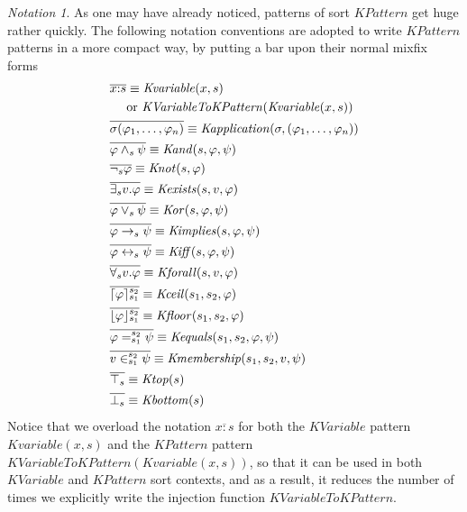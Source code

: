 \documentclass[UTF8,11pt]{article}
\newcounter{thmcounter}
\theoremstyle{plain}
\theoremstyle{definition}
\theoremstyle{remark}
\newtheorem{notation}   [thmcounter]{Notation}
\DeclarePairedDelimiter{\ceil}{\lceil}{\rceil}
\DeclarePairedDelimiter{\floor}{\lfloor}{\rfloor}
\newcommand{\cln}{{:}}
\newcommand{\KVariable}{\mathit{KVariable}}
\newcommand{\KVariableToKPattern}{\mathit{KVariableToKPattern}}
\newcommand{\KPattern}{\mathit{KPattern}}
\newcommand{\Kvariable}{\mathit{Kvariable}}
\newcommand{\Kand}{\mathit{Kand}}
\newcommand{\Kor}{\mathit{Kor}}
\newcommand{\Kimplies}{\mathit{Kimplies}}
\newcommand{\Kiff}{\mathit{Kiff}}
\newcommand{\Knot}{\mathit{Knot}}
\newcommand{\Kapplication}{\mathit{Kapplication}}
\newcommand{\Kexists}{\mathit{Kexists}}
\newcommand{\Kforall}{\mathit{Kforall}}
\newcommand{\Kequals}{\mathit{Kequals}}
\newcommand{\Kmembership}{\mathit{Kmembership}}
\newcommand{\Ktop}{\mathit{Ktop}}
\newcommand{\Kbottom}{\mathit{Kbottom}}
\newcommand{\Kfloor}{\mathit{Kfloor}}
\newcommand{\Kceil}{\mathit{Kceil}}
\begin{document}
\begin{notation}
	As one may have already noticed, patterns of sort $\KPattern$ get huge rather quickly.
	The following notation conventions are adopted to write $\KPattern$ patterns in a more compact way, by putting a bar upon their normal mixfix forms
	\begin{align*}
	  & \overline{x \cln s} \equiv \Kvariable(x, s) \\
	  & \quad \ \text{or } \KVariableToKPattern(\Kvariable(x, s))
	  \\
	  & \overline{\sigma(\varphi_1, \dots, \varphi_n)} \equiv \Kapplication(\sigma, (\varphi_1, \dots, \varphi_n))
	  \\
	  & \overline{\varphi \wedge_s \psi} \equiv \Kand(s, \varphi, \psi)
	  \\
	  & \overline{\neg_s \varphi} \equiv \Knot(s, \varphi)
	  \\
	  & \overline{\exists_s v . \varphi} \equiv 
	  \Kexists(s, v, \varphi)
	  \\
	  & \overline{\varphi \vee_s \psi} \equiv \Kor(s, \varphi, \psi)
	  \\
	  & \overline{\varphi \to_s \psi} \equiv \Kimplies(s, \varphi, \psi)
	  \\
	  & \overline{\varphi \leftrightarrow_s \psi} \equiv \Kiff(s, \varphi, \psi)
	  \\
	  & \overline{\forall_s v . \varphi} \equiv \Kforall(s, v, \varphi)
      \\
      & \overline{\ceil{\varphi}_{s_1}^{s_2}} \equiv \Kceil(s_1, s_2, \varphi)
      \\
      & \overline{\floor{\varphi}_{s_1}^{s_2}} \equiv \Kfloor(s_1, s_2, \varphi)
      \\
      & \overline{\varphi =_{s_1}^{s_2} \psi} \equiv \Kequals(s_1, s_2, 
      \varphi, \psi)
      \\
      & \overline{v \in_{s_1}^{s_2} \psi} \equiv \Kmembership(s_1, s_2, v, 
      \psi)
      \\
      & \overline{\top_s} \equiv \Ktop(s)
      \\
      & \overline{\bot_s} \equiv \Kbottom(s)
	\end{align*}
	Notice that we overload the notation $\overline{x \cln s}$ for both 
	the $\KVariable$ pattern $\Kvariable(x, s)$ and the $\KPattern$ pattern 
	$\KVariableToKPattern(\Kvariable(x, s))$, so that it can be used in both 
	$\KVariable$ and $\KPattern$ sort contexts, and as a result, it reduces the 
	number of times we explicitly write the injection function 
	$\KVariableToKPattern$.
\end{notation}
\end{document}
